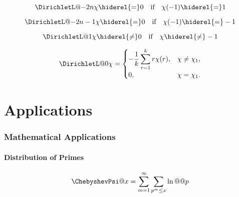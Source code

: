 \documentclass{article}
\begin{document}

\begin{equation}\label{eq:ZE.DIR.DIR6}%
  \DirichletL@{-2n}{\chi} \hiderel{=} 0 \text{\quad if\quad} \chi(-1) \hiderel{=} 1 
\end{equation}

\begin{equation}\label{eq:ZE.DIR.DIR7}%
  \DirichletL@{-2n-1}{\chi} \hiderel{=} 0 \text{\quad if\quad} \chi(-1) \hiderel{=} -1 
\end{equation}

\begin{equation}\label{eq:ZE.DIR.DIR8}%
  \DirichletL@{1}{\chi} \hiderel{\neq} 0 \text{\quad if\quad} \chi \hiderel{\neq} -1 
\end{equation}


\begin{equation}\label{eq:ZE.DIR.DIR10}%
  \DirichletL@{0}{\chi}
  = \begin{cases}
      \displaystyle
      -\frac{1}{k} \sum_{r=1}^k r \chi(r), & \chi \neq \chi_1,
    \\
      0, & \chi = \chi_1.
    \end{cases}
\end{equation}

\part{Applications}\label{pt:ZE.APPL}

\section{Mathematical Applications}\label{sec:ZE.APPL}%
 

\subsection{Distribution of Primes}\label{sec:ZE.APPL.PRIM}%


\begin{equation}\label{eq:ZE.PRIM.PRIM1}%
  \ChebyshevPsi@{x} = \sum_{m=1}^\infty \sum_{p^m \leq x} \ln@@{p}
\end{equation}
\end{document}

